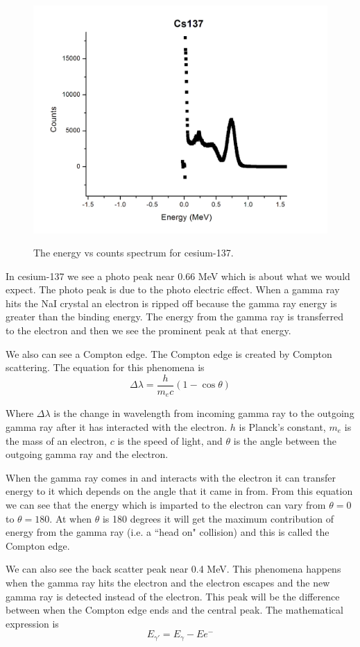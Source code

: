 \documentclass[12pt letterpaper]{article}
\begin{document}
\begin{figure}[H]
  \caption{The energy vs counts spectrum for cesium-137.}
  \centering
    \includegraphics[width=.60\textwidth]{cs137.JPG}
    \label{fig:cs137}
\end{figure}

In cesium-137 we see a photo peak near 0.66 MeV which is about what we would expect. The photo peak is due to the photo electric effect. When a gamma ray hits the NaI crystal an electron is ripped off because the gamma ray energy is greater than the binding energy. The energy from the gamma ray is transferred to the electron and then we see the prominent peak at that energy. 

We also can see a Compton edge. The Compton edge is created by Compton scattering. The equation for this phenomena is 
\begin{equation}
\Delta \lambda = \frac{h}{m_e c} ( 1 - \cos \theta) 
\end{equation}

Where $\Delta\lambda$ is the change in wavelength from incoming gamma ray to the outgoing gamma ray after it has interacted with the electron. $h$ is Planck's constant, $m_e$ is the mass of an electron, $c$ is the speed of light, and $\theta$ is the angle between the outgoing gamma ray and the electron. 

When the gamma ray comes in and interacts with the electron it can transfer energy to it which depends on the angle that it came in from. From this equation we can see that the energy which is imparted to the electron can vary from $\theta=0$ to $\theta=180$. At when $\theta$ is 180 degrees it will get the maximum contribution of energy from the gamma ray (i.e. a ``head on" collision) and this is called the Compton edge. 

We can also see the back scatter peak near 0.4 MeV. This phenomena happens when the gamma ray hits the electron and the electron escapes and the new gamma ray is detected instead of the electron. This peak will be the difference between when the Compton edge ends and the central peak. The mathematical expression is 
$$ 
E_{\gamma'} = E_{\gamma} - E{e^-}
$$
\end{document}
